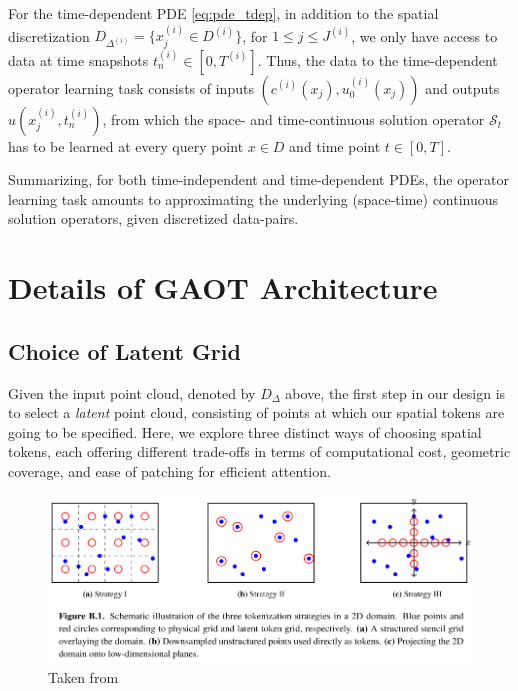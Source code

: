 \documentclass[reqno,10pt]{amsart}
\theoremstyle{plain}
\theoremstyle{definition}
\newcommand{\cal}[1]{\mathcal{#1}}
\begin{document}
\noindent For the time-dependent PDE \ref{eq:pde_tdep}, in addition to the spatial discretization $D_{\Delta^{(i)}} = \{x^{(i)}_j \in D^{(i)}\}$, for $1\leq j \leq J^{(i)}$, we only have access to data at time snapshots $t_n^{(i)} \in [0,T^{(i)}]$. Thus, the data to the time-dependent operator learning task consists of inputs $(c^{(i)}(x_j), u_0^{(i)}(x_j))$ and outputs $u(x_j^{(i)}, t_n^{(i)})$, from which the space- and time-continuous solution operator $\cal S_t$ has to be learned at every query point $x\in D$ and time point $t \in [0,T]$.

\noindent Summarizing, for both time-independent and time-dependent PDEs, the operator learning task amounts to approximating the underlying (space-time) continuous solution operators, given discretized data-pairs.

\section{\bf Details of GAOT Architecture}
\subsection{\bf Choice of Latent Grid} \label{appendix:lgrid}
Given the input point cloud, denoted by $D_\Delta$ above, the first step in our design is to select a {\it latent} point cloud, consisting of points at which our spatial tokens are going to be specified. Here, we explore three distinct ways of choosing spatial tokens, each offering different trade-offs in terms of computational cost, geometric coverage, and ease of patching for efficient attention.
\begin{figure}[!ht]
    \centering
    \includegraphics[width=\textwidth]{latent_grid.png}
    \caption{Taken from \cite{SW2025}}
    \label{fig:latent_grid}
\end{figure}
\end{document}
